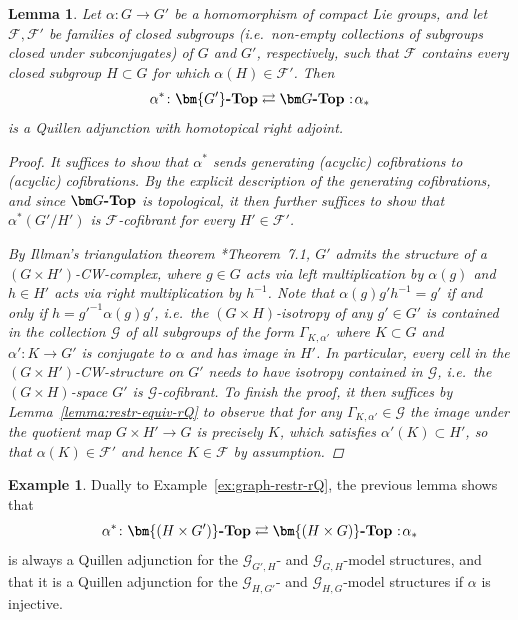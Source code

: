 \documentclass[reqno]{memo-l}
\theoremstyle{mythm}
\newtheorem{lemma}[thm]{Lemma}
\theoremstyle{definition}
\newtheorem{ex}[thm]{Example}
\numberwithin{equation}{section}
\newcommand{\Ff}{{\mathcal{F}}}
\newcommand{\cat}[1]{\textbf{\textup{#1}}}
\newcommand\noloc{%
	\nobreak
	\mspace{6mu plus 1mu}
	{:}
	\nonscript\mkern-\thinmuskip
	\mathpunct{}
	\mspace{2mu}
}
\begin{document}
\begin{lemma}\label{lemma:restr-equiv-lQ}
    Let $\alpha\colon G\to G'$ be a homomorphism of compact Lie groups, and let $\Ff,\Ff'$ be \emph{families} of closed subgroups (i.e.\ non-empty collections of subgroups closed under subconjugates) of $G$ and $G'$, respectively, such that $\Ff$ contains every closed subgroup $H\subset G$ for which $\alpha(H)\in\Ff'$.
    Then
    \[
        \alpha^*\colon\cat{$\bm{G'}$-Top}\rightleftarrows\cat{$\bm G$-Top} \noloc\alpha_*
    \]
    is a Quillen adjunction with homotopical right adjoint.
    \begin{proof}
        It suffices to show that $\alpha^*$ sends generating (acyclic) cofibrations to (acyclic) cofibrations. By the explicit description of the generating cofibrations, and since $\cat{$\bm G$-Top}$ is topological, it then further suffices to show that $\alpha^*(G'/H')$ is $\Ff$-cofibrant for every $H'\in\Ff'$.

        By Illman's triangulation theorem \cite{illman-triangle}*{Theorem~7.1}, $G'$ admits the structure of a $(G\times H')$-CW-complex, where $g\in G$ acts via left multiplication by $\alpha(g)$ and $h\in H'$ acts via right multiplication by $h^{-1}$. Note that $\alpha(g)g'h^{-1}=g'$ if and only if $h=g'^{-1}\alpha(g)g'$, i.e.~the $(G\times H)$-isotropy of any $g'\in G'$ is contained in the collection $\mathcal G$ of all subgroups of the form $\Gamma_{K,\alpha'}$ where $K\subset G$ and $\alpha'\colon K\to G'$ is conjugate to $\alpha$ and has image in $H'$. In particular, every cell in the $(G\times H')$-CW-structure on $G'$ needs to have isotropy contained in $\mathcal G$, i.e.\ the $(G\times H)$-space $G'$ is $\mathcal G$-cofibrant. To finish the proof, it then suffices by Lemma~\ref{lemma:restr-equiv-rQ} to observe that for any $\Gamma_{K,\alpha'}\in\mathcal G$ the image under the quotient map $G\times H'\to G$ is precisely $K$, which satisfies $\alpha'(K)\subset H'$, so that $\alpha(K)\in\Ff'$ and hence $K\in\mathcal F$ by assumption.
    \end{proof}
\end{lemma}

\begin{ex}\label{ex:graph-restr-lQ}
    Dually to Example~\ref{ex:graph-restr-rQ}, the previous lemma shows that
    \[
        \alpha^*\colon\cat{$\bm{(H\times G')}$-Top}\rightleftarrows\cat{$\bm{(H\times G)}$-Top} \noloc\alpha_*
    \]
    is always a Quillen adjunction for the $\mathcal G_{G',H}$- and $\mathcal G_{G,H}$-model structures, and that it is a Quillen adjunction for the $\mathcal G_{H,G'}$- and $\mathcal G_{H,G}$-model structures if $\alpha$ is injective.
\end{ex}
\end{document}
